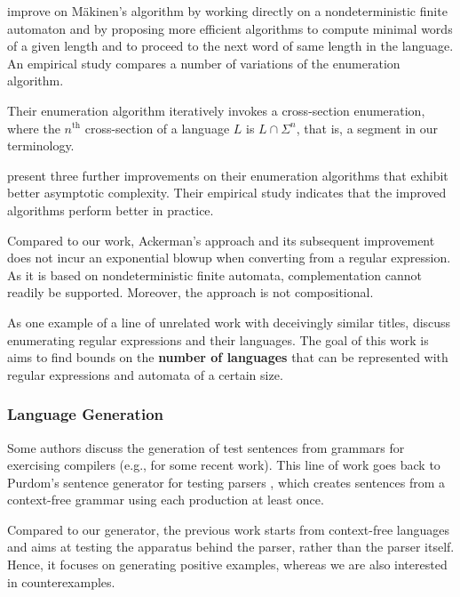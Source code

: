 \citet{DBLP:journals/tcs/AckermanS09} improve on M{\"{a}}kinen's
algorithm by working directly on a nondeterministic finite automaton
and by proposing more efficient algorithms to compute minimal words of
a given length and to proceed to the next word of same length in the
language. An empirical study compares a number of variations of the
enumeration algorithm.

Their enumeration algorithm iteratively invokes a cross-section
enumeration, where the $n^{\text{th}}$ cross-section of a language $L$ is
$L \cap \Sigma^n$, that is, a segment in our terminology.

\citet{DBLP:conf/cocoon/AckermanM09} present three further
improvements on their enumeration algorithms that exhibit better
asymptotic complexity. Their empirical study indicates that the
improved algorithms perform better in practice.

Compared to our work, Ackerman's approach and its subsequent improvement does not incur an
exponential blowup when converting from a regular expression. As it is based on
nondeterministic finite automata, complementation cannot readily be
supported. Moreover, the approach is not compositional.


As one example of a line of unrelated work with deceivingly similar
titles, \citet{DBLP:conf/wia/LeeS04} discuss enumerating regular
expressions and their languages. The goal of this work is aims to find
bounds on the \textbf{number of languages} that can be represented
with regular expressions and automata of a certain size.



\subsubsection*{Language Generation}
Some authors discuss the generation of test sentences from grammars for
exercising compilers
(e.g., \cite{DBLP:conf/cisse/ParachaF08,DBLP:conf/compsac/ZhengW09}
for some recent work). This
line of work goes back to Purdom's sentence generator for testing
parsers \cite{purdom72:_senten_gener_testin_parser}, which creates
sentences from a context-free grammar using each production at least
once.

Compared to our generator, the previous work starts from context-free
languages and aims at testing the apparatus behind the parser,
rather than the parser itself. Hence, it focuses on generating
positive examples, whereas we are also interested in counterexamples.

